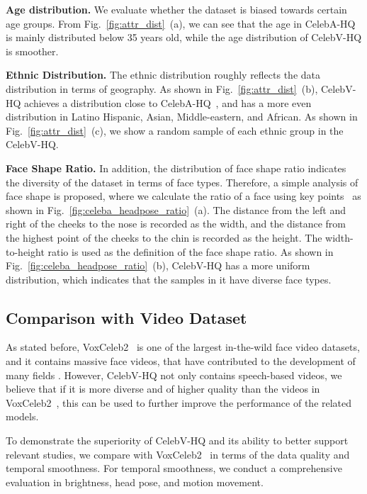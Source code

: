 \textbf{Age distribution.} We evaluate whether the dataset is biased towards certain age groups. From Fig.~\ref{fig:attr_dist}~(a), we can see that the age in CelebA-HQ is mainly distributed below 35 years old, while the age distribution of CelebV-HQ is smoother.

\textbf{Ethnic Distribution.} The ethnic distribution roughly reflects the data distribution in terms of geography. As shown in Fig.~\ref{fig:attr_dist}~(b), CelebV-HQ achieves a distribution close to CelebA-HQ~\cite{celebahq}, and has a more even distribution in Latino Hispanic, Asian, Middle-eastern, and African. As shown in Fig.~\ref{fig:attr_dist}~(c), we show a random sample of each ethnic group in the CelebV-HQ.

 \textbf{Face Shape Ratio.} In addition, the distribution of face shape ratio indicates the diversity of the dataset in terms of face types. Therefore, a simple analysis of face shape is proposed, where we calculate the ratio of a face using key points~\cite{wu2018look} as shown in Fig.~\ref{fig:celeba_headpose_ratio}~(a).
The distance from the left and right of the cheeks to the nose is recorded as the width, and the distance from the highest point of the cheeks to the chin is recorded as the height. The width-to-height ratio is used as the definition of the face shape ratio. As shown in Fig.~\ref{fig:celeba_headpose_ratio}~(b), CelebV-HQ has a more uniform distribution, which indicates that the samples in it have diverse face types.

\subsection{Comparison with Video Dataset}

As stated before, VoxCeleb2~\cite{vox2} is one of the largest in-the-wild face video datasets, and it contains massive face videos, that have contributed to the development of many fields \cite{ephrat2018looking,zhu2021deep,gao2021visualvoice,zhou2019talking,chen2019hierarchical,zhu2021arbitrary,zhou2021pose,ji2021audio}. However, CelebV-HQ not only contains speech-based videos, we believe that if it is more diverse and of higher quality than the videos in VoxCeleb2~\cite{vox2}, this can be used to further improve the performance of the related models.

To demonstrate the superiority of CelebV-HQ and its ability to better support relevant studies, we compare with VoxCeleb2~\cite{vox2} in terms of the data quality and temporal smoothness. For temporal smoothness, we conduct a comprehensive evaluation in brightness, head pose, and motion movement. 

